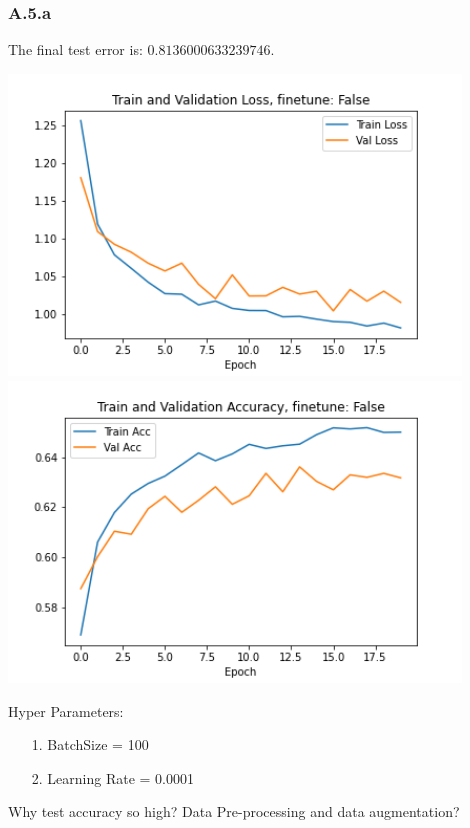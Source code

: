 \documentclass[]{article}
\begin{document}
    \subsubsection*{A.5.a}
        The final test error is: $0.8136000633239746$. 
        \begin{center}
            \includegraphics[width=12cm]{a5plots/A5a-train-val-loss-False1.png}
            \includegraphics[width=12cm]{a5plots/A5a-train-val-acc-False1.png}
        \end{center}
        Hyper Parameters: 
        \begin{enumerate}
            \item[1.] BatchSize = 100
            \item[2.] Learning Rate = 0.0001 
        \end{enumerate}
        Why test accuracy so high? Data Pre-processing and data augmentation? 
    
\end{document}
